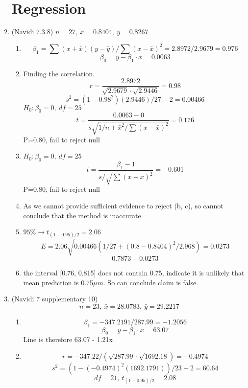 \documentclass[11pt]{article}
\begin{document}
\begin{preview}
\begin{enumerate}
\section*{Regression}
\item (Navidi 7.3.8)
$n=27,\:\bar{x}=0.8404,\:\bar{y} = 0.8267$
\begin{enumerate}
        \item $$\beta_1 = \sum(x+\bar{x})(y-\bar{y}) / \sum(x-\bar{x})^2 = 2.8972/2.9679 = 0.976$$
        $$\beta_0 = \bar{y}-\beta_1{\cdot}\bar{x} = 0.0063$$
        \item Finding the correlation. 
        $$r = \frac{2.8972}{\sqrt{2.9679}\cdot\sqrt{2.9446}} = 0.98$$
        $$s^2 = (1-0.98^2)(2.9446) / 27-2 = 0.00466$$
        $H_0: \beta_0=0,\:df=25$
        $$t = \frac{0.0063-0}{s\sqrt{1/n + \bar{x}^2 / \sum(x-\bar{x})^2}} = 0.176$$
        P=0.80, fail to reject null
        \item  $H_0: \beta_0=0,\:df=25$
        $$t = \frac{\beta_1-1}{s/\sqrt{\sum(x-\bar{x})^2}} = -0.601$$
        P=0.80, fail to reject null
        \item As we cannot provide sufficient evidence to reject (b, c), so cannot conclude that the method is inaccurate.
        \item $95\% \rightarrow t_{(1-0.95)/2} = 2.06$
        $$E = 2.06\sqrt{0.00466(1/27 + (0.8-0.8404)^2 / 2.968)} = 0.0273$$
        $$0.7873\pm0.0273$$
        \item the interval [0.76, 0.815] does not contain 0.75, indicate it is unlikely that mean prediction is 0.75$\mu m$. So can conclude claim is false.
\end{enumerate}

\item (Navidi 7 supplementary 10) 
$$n=23,\:\bar{x}=28.0783,\:\bar{y}=29.2217$$
\begin{enumerate}
        \item $$\beta_1 = -347.2191/287.99 = -1.2056$$
        $$\beta_0 = \bar{y} - \beta_1{\cdot}\bar{x} = 63.07$$
        Line is therefore 63.07 - 1.21x
        \item $$r = -347.22 / (\sqrt{287.99}{\cdot}\sqrt{1692.18}) = -0.4974$$
        $$s^2 = (1-(-0.4974)^2(1692.1791)) / 23-2 = 60.64$$
        $$df=21,\: t_{(1-0.95)/2} = 2.08$$ 
\end{enumerate}
        
\end{enumerate}
\end{preview}
\end{document}

